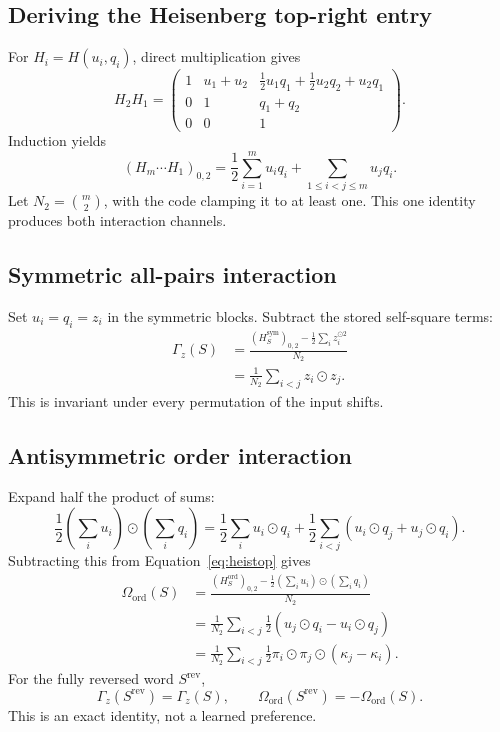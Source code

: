 \documentclass[11pt,a4paper]{article}
\newcommand{\od}{\odot}
\begin{document}
\subsection{Deriving the Heisenberg top-right entry}

For $H_i=H(u_i,q_i)$, direct multiplication gives
\[
H_2H_1=
\begin{pmatrix}
1&u_1+u_2&
\tfrac12u_1q_1+\tfrac12u_2q_2+u_2q_1\\
0&1&q_1+q_2\\
0&0&1
\end{pmatrix}.
\]
Induction yields
\begin{equation}
(H_m\cdots H_1)_{0,2}
=\frac12\sum_{i=1}^m u_iq_i+
\sum_{1\le i<j\le m}u_jq_i.
\label{eq:heistop}
\end{equation}
Let $N_2=\binom{m}{2}$, with the code clamping it to at least one.  This one
identity produces both interaction channels.

\subsection{Symmetric all-pairs interaction}

Set $u_i=q_i=z_i$ in the symmetric blocks.  Subtract the stored self-square
terms:
\begin{align}
\Gamma_z(S)
&=\frac{(H_S^{\mathrm{sym}})_{0,2}
-\tfrac12\sum_i z_i^{\od2}}{N_2}\\
&=\frac1{N_2}\sum_{i<j}z_i\od z_j.
\label{eq:gamma}
\end{align}
This is invariant under every permutation of the input shifts.

\subsection{Antisymmetric order interaction}

Expand half the product of sums:
\begin{equation}
\frac12\left(\sum_i u_i\right)\od\left(\sum_iq_i\right)
=\frac12\sum_i u_i\od q_i
+\frac12\sum_{i<j}(u_i\od q_j+u_j\od q_i).
\end{equation}
Subtracting this from Equation~\eqref{eq:heistop} gives
\begin{align}
\Omega_{\mathrm{ord}}(S)
&=\frac{(H_S^{\mathrm{ord}})_{0,2}
-\tfrac12(\sum_i u_i)\od(\sum_iq_i)}{N_2}\\
&=\frac1{N_2}\sum_{i<j}\frac12
(u_j\od q_i-u_i\od q_j)\\
&=\frac1{N_2}\sum_{i<j}\frac12
\pi_i\od\pi_j\od(\kappa_j-\kappa_i).
\label{eq:omega}
\end{align}
For the fully reversed word $S^{\mathrm{rev}}$,
\begin{equation}
\Gamma_z(S^{\mathrm{rev}})=\Gamma_z(S),
\qquad
\Omega_{\mathrm{ord}}(S^{\mathrm{rev}})=-\Omega_{\mathrm{ord}}(S).
\end{equation}
This is an exact identity, not a learned preference.
\end{document}
